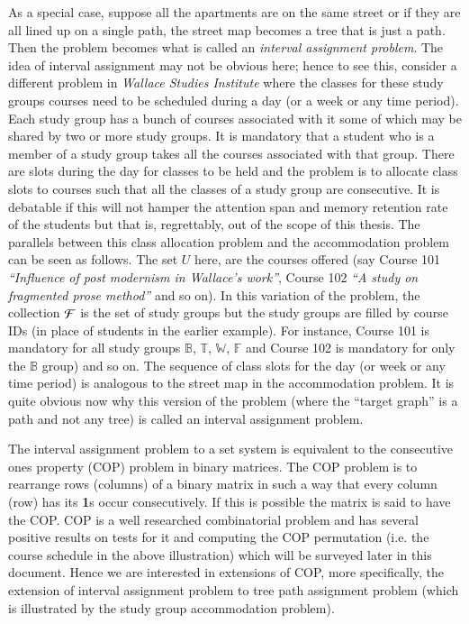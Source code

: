 \documentclass[MS,synopsis]{iitmdiss}
\def \un {\bf 1}
\def \xLLL {\mathbb{B}}
\def \xGGG {\mathbb{T}}
\def \xBBB {\mathbb{W}}
\def \xTTT {\mathbb{F}}
\def \WSI {{\em Wallace Studies Institute}}
\def \coneohone {{\em ``Influence of post modernism in Wallace's work''}}
\def \coneohtwo {{\em ``A study on fragmented prose method''}}
\begin{document}
As a special case, suppose all the apartments are on the same street
or if they are all lined up on a single path, the street map becomes a
tree that is just a path. Then the problem becomes what is called an
{\em interval assignment problem}. The idea of interval assignment may
not be obvious here; hence to see this, consider a different problem
in {\WSI} where the classes for these study groups courses need to be
scheduled during a day (or a week or any time period). Each study
group has a bunch of courses associated with it some of which may be
shared by two or more study groups. It is mandatory that a student who
is a member of a study group takes all the courses associated with
that group. There are slots during the day for classes to be held and
the problem is to allocate class slots to courses such that all the
classes of a study group are consecutive. It is debatable if this will
not hamper the attention span and memory retention rate of the
students but that is, regrettably, out of the scope of this
thesis. The parallels between this class allocation problem and the
accommodation problem can be seen as follows. The set $U$ here, are
the courses offered (say Course 101 {\coneohone}, Course 102
{\coneohtwo} and so on). In this variation of the problem, the
collection ${\cal F}$ is the set of study groups but the study groups are
filled by course IDs (in place of students in the earlier
example). For instance, Course 101 is mandatory for all study groups
$\xLLL$, $\xGGG$, $\xBBB$, $\xTTT$ and Course 102 is mandatory for
only the $\xLLL$ group) and so on. The sequence of class slots for the
day (or week or any time period) is analogous to the street map in the
accommodation problem. It is quite obvious now why this version of the
problem (where the ``target graph'' is a path and not any
tree) is called an interval assignment
problem.

The interval assignment problem to a set system is equivalent to the
consecutive ones property (COP) problem in binary matrices\cite{wlh02,
  nsnrs09}.  The COP problem is to rearrange rows (columns) of a
binary matrix in such a way that every column (row) has its {\un}s
occur consecutively. If this is possible the matrix is said to have
the COP.  COP is a well researched combinatorial problem and has
several positive results on tests for it and computing the COP
permutation (i.e. the course schedule in the above illustration) which
will be surveyed later in this document. Hence we are interested in
extensions of COP, more specifically, the extension of interval
assignment problem to tree path assignment problem (which is
illustrated by the study group accommodation problem).
\end{document}
